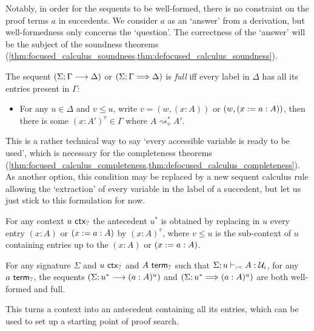 \documentclass[twoside]{report}
\begin{document}
Notably, in order for the sequents to be well-formed, there is no constraint on the proof terms $a$ in succedents. We consider $a$ as an `answer' from a derivation, but well-formedness only concerns the `question'. The correctness of the `answer' will be the subject of the soundness theorems (\cref{thm:focused_calculus_soundness,thm:defocused_calculus_soundness}).

\begin{definition}
    \label{def:full_sequents}
    The sequent $(\Sigma; \Gamma \longrightarrow \Delta)$ or $(\Sigma; \Gamma \Longrightarrow \Delta)$ is \emph{full} iff every label in $\Delta$ has all its entries present in $\Gamma$:
    \begin{itemize}[noitemsep]
        \item For any $u \in \Delta$ and $v \leq u$, write $v = (w, (x : A))$ or $(w, (x := a : A))$, then there is some $(x : A')^v \in \Gamma$ where $A \rightsquigarrow^\ast_v A'$.
    \end{itemize}
\end{definition}

This is a rather technical way to say `every accessible variable is ready to be used', which is necessary for the completeness theorems (\cref{thm:focused_calculus_completeness,thm:defocused_calculus_completeness}). As another option, this condition may be replaced by a new sequent calculus rule allowing the `extraction' of every variable in the label of a succedent, but let us just stick to this formulation for now.

\begin{definition}
    \label{def:sequents_and_contexts}
    For any context $u \ \mathsf{ctx}_{?}$ the antecedent $u^\ast$ is obtained by replacing in $u$ every entry $(x : A)$ or $(x := a : A)$ by $(x : A)^v$, where $v \leq u$ is the sub-context of $u$ containing entries up to the $(x : A)$ or $(x := a : A)$.
\end{definition}

\begin{example}
    \label{thm:well_formed_sequents_from_contexts}
    For any signature $\Sigma$ and $u \ \mathsf{ctx}_{?}$ and $A \ \mathsf{term}_{?}$ such that $\Sigma; u \vdash_{:=} A : \mathcal U_i$, for any $a \ \mathsf{term}_{?}$, the sequents $(\Sigma; u^\ast \longrightarrow (a : A)^u)$ and $(\Sigma; u^\ast \Longrightarrow (a : A)^u)$ are both well-formed and full.
\end{example}

This turns a context into an antecedent containing all its entries, which can be used to set up a starting point of proof search.
\end{document}
